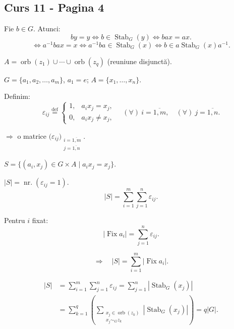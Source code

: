 
\subsection*{Curs 11 - Pagina 4}

\noindent Fie $b\in G$. Atunci:
\[
by=y\iff b\in\operatorname{Stab}_G(y)
\iff bax=ax.
\]
\[
\iff a^{-1}bax=x
\iff a^{-1}ba\in\operatorname{Stab}_G(x)
\iff b\in a\operatorname{Stab}_G(x)a^{-1}.
\]

\bigskip
\noindent $A=\operatorname{orb}(z_1)\cup\cdots\cup
\operatorname{orb}(z_q)$ \quad (reuniune disjunctă).

\bigskip
\noindent $G=\{a_1,a_2,\ldots,a_m\}$, \quad $a_1=e$;
\qquad $A=\{x_1,\ldots,x_n\}$.

\medskip
\noindent Definim:
\[
\varepsilon_{ij}\overset{\mathrm{def}}{=}
\begin{cases}
1, & a_i x_j=x_j,\\
0, & a_i x_j\neq x_j,
\end{cases}
\quad (\forall)\ i=\overline{1,m},\quad
(\forall)\ j=\overline{1,n}.
\]

\noindent $\Rightarrow$ o matrice
$\bigl(\varepsilon_{ij}\bigr)_{\substack{i=\overline{1,m}\\j=\overline{1,n}}}$.

\bigskip
\noindent $S=\{(a_i,x_j)\in G\times A\mid a_i x_j=x_j\}$.

\noindent $|S|=\operatorname{nr.}(\varepsilon_{ij}=1)$.
\[
|S|=\sum_{i=1}^{m}\sum_{j=1}^{n}\varepsilon_{ij}.
\]

\noindent Pentru $i$ fixat:
\[
|\operatorname{Fix}a_i|=\sum_{j=1}^{n}\varepsilon_{ij}.
\]

\[
\Rightarrow\quad |S|=\sum_{i=1}^{m}|\operatorname{Fix}a_i|.
\]

\[
\begin{aligned}
|S|
&=\sum_{i=1}^{m}\sum_{j=1}^{n}\varepsilon_{ij}
 =\sum_{j=1}^{n}|\operatorname{Stab}_G(x_j)|\\[3pt]
&=\sum_{k=1}^{q}\left(
\sum_{\substack{x_j\in\operatorname{orb}(z_k)\\x_j\sim_G z_k}}
|\operatorname{Stab}_G(x_j)|\right)
 =q|G|.
\end{aligned}
\]

